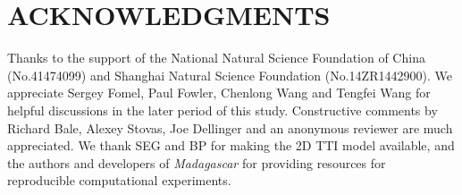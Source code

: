 %
\section{ACKNOWLEDGMENTS}
Thanks to the support of the National Natural Science Foundation of China (No.41474099)
and Shanghai Natural Science Foundation (No.14ZR1442900). 
We appreciate Sergey Fomel, Paul Fowler, Chenlong Wang and Tengfei Wang
for helpful discussions in the later period of this study.
Constructive comments by Richard Bale, Alexey Stovas, Joe Dellinger and an anonymous reviewer
are much appreciated.
We thank SEG and BP for making the 2D TTI model available,
and the authors and developers of \emph{Madagascar} for providing resources
for reproducible computational experiments.



